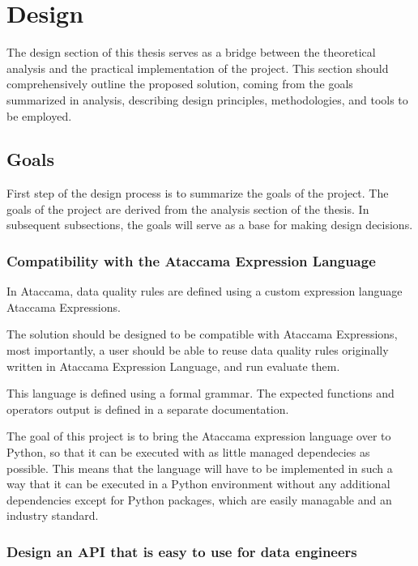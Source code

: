 
\chapter{Design}

The design section of this thesis serves as a bridge between the theoretical analysis and the practical implementation of the project. This section should comprehensively outline the proposed solution, coming from the goals summarized in analysis, describing design principles, methodologies, and tools to be employed. 

\section{Goals}

First step of the design process is to summarize the goals of the project. The goals of the project are derived from the analysis section of the thesis. In subsequent subsections, the goals will serve as a base for making design decisions. 


\subsection{ Compatibility with the Ataccama Expression Language}

In Ataccama, data quality rules are defined using a custom expression language Ataccama Expressions. 

The solution should be designed to be compatible with Ataccama Expressions, most importantly, a user should be able to reuse data quality rules originally written in Ataccama Expression Language, and run evaluate them.

This language is defined using a formal grammar. The expected functions and operators output is defined in a separate documentation.

The goal of this project is to bring the Ataccama expression language over to Python, so that it can be executed with as little managed dependecies as possible. This means that the language will have to be implemented in such a way that it can be executed in a Python environment without any additional dependencies except for Python packages, which are easily managable and an industry standard.


\subsection{Design an API that is easy to use for data engineers}

